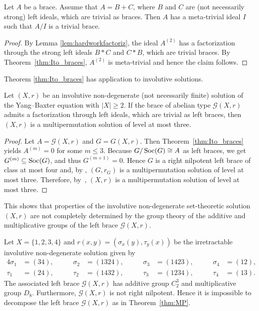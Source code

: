 \begin{corollary}
    Let $A$ be a brace. Assume that $A= B + C$, where $B$ and $C$ are (not necessarily strong) left ideals,
    which are trivial as braces. Then $A$ has a meta-trivial ideal $I$ such that $A/I$ is a trivial brace.
\end{corollary}

\begin{proof}
    By Lemma \ref{lem:hardworkfactoriz}, the ideal $A^{(2)}$ has a factorization through the strong left ideals $B*C$ and $C*B$,
    which are trivial braces. By Theorem~\ref{thm:Ito_braces}, $A^{(2)}$ is meta-trivial and hence the claim follows.
\end{proof}

Theorem \ref{thm:Ito_braces} has application to involutive solutions. 

\begin{theorem} 
\label{thm:MP}
Let $(X,r)$ be an involutive non-degenerate (not necessarily finite) solution of the Yang--Baxter equation with $|X|\geq 2$.
If the brace of abelian type $\mathcal{G}(X,r)$ admits a factorization through left ideals, 
which are trivial as left braces, then $(X,r)$ is a
multipermutation solution of level at most three.
\end{theorem}

\begin{proof}
Let $A=\mathcal{G}(X,r)$ and $G=G(X,r)$. Then Theorem~\ref{thm:Ito_braces} 
yields $A^{(m)}=0$ for some $m\leq 3$. Because $G/\operatorname{Soc}(G)\cong A$
as left braces, we get $G^{(m)}\subseteq\operatorname{Soc}(G)$, and thus $G^{(m+1)}=0$. Hence $G$ is a right nilpotent left brace of class at most four and,
by \cite[Proposition 6]{MR3574204}, $(G,r_G)$ is a multipermutation solution of  level at most three. Therefore, by~\cite[Theorem 5.15]{MR3861714}, 
$(X,r)$ is a multipermutation solution of level at most three.
\end{proof}

This shows that properties of the involutive non-degenerate set-theoretic solution $(X,r)$ are not completely determined by the
group theory of the additive and multiplicative groups of the left brace $\mathcal{G}(X,r)$. 

\begin{example}
\label{exa:B(8,27)}
Let $X=\{1,2,3,4\}$ and $r(x,y)=(\sigma_x(y),\tau_y(x))$ be the irretractable involutive non-degenerate solution given by 
\begin{alignat*}{4}
    \sigma_1 & =(34),\qquad & \sigma_2 & =(1324),\qquad & \sigma_3 & =(1423),\qquad & \sigma_4 & =(12),\\
    \tau_1 & =(24),\qquad & \tau_2 & =(1432),\qquad & \tau_3 & =(1234),\qquad & \tau_4 & =(13).
\end{alignat*}
The associated left brace $\mathcal{G}(X,r)$ has additive group $C_2^3$ and multiplicative group $D_8$. Furthermore,
$\mathcal{G}(X,r)$ is not right nilpotent. Hence it is impossible to decompose the left brace $\mathcal{G}(X,r)$ as in Theorem~\ref{thm:MP}. 
\end{example}

